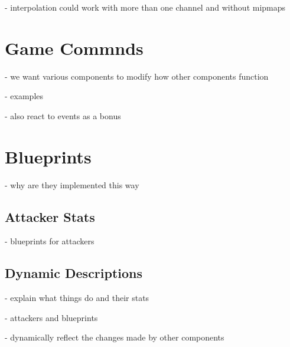 - interpolation could work with more than one channel and without mipmaps

\section{Game Commnds}

- we want various components to modify how other components function

- examples

- also react to events as a bonus

\section{Blueprints}

- why are they implemented this way

\subsection{Attacker Stats}

- blueprints for attackers

\subsection{Dynamic Descriptions}

- explain what things do and their stats

- attackers and blueprints

- dynamically reflect the changes made by other components
